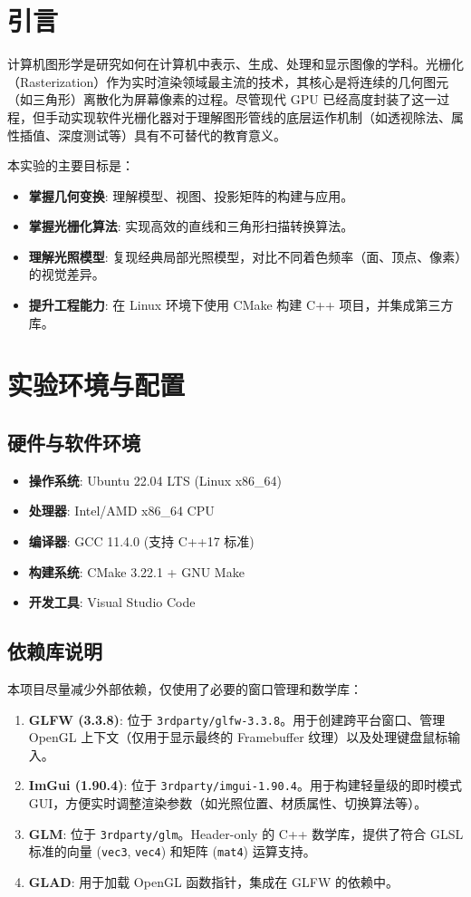 \documentclass[a4paper]{article}
\begin{document}
\section{引言}
计算机图形学是研究如何在计算机中表示、生成、处理和显示图像的学科。光栅化（Rasterization）作为实时渲染领域最主流的技术，其核心是将连续的几何图元（如三角形）离散化为屏幕像素的过程。尽管现代 GPU 已经高度封装了这一过程，但手动实现软件光栅化器对于理解图形管线的底层运作机制（如透视除法、属性插值、深度测试等）具有不可替代的教育意义。

本实验的主要目标是：
\begin{itemize}
    \item \textbf{掌握几何变换}: 理解模型、视图、投影矩阵的构建与应用。
    \item \textbf{掌握光栅化算法}: 实现高效的直线和三角形扫描转换算法。
    \item \textbf{理解光照模型}: 复现经典局部光照模型，对比不同着色频率（面、顶点、像素）的视觉差异。
    \item \textbf{提升工程能力}: 在 Linux 环境下使用 CMake 构建 C++ 项目，并集成第三方库。
\end{itemize}

\section{实验环境与配置}

\subsection{硬件与软件环境}
\begin{itemize}
    \item \textbf{操作系统}: Ubuntu 22.04 LTS (Linux x86\_64)
    \item \textbf{处理器}: Intel/AMD x86\_64 CPU
    \item \textbf{编译器}: GCC 11.4.0 (支持 C++17 标准)
    \item \textbf{构建系统}: CMake 3.22.1 + GNU Make
    \item \textbf{开发工具}: Visual Studio Code
\end{itemize}

\subsection{依赖库说明}
本项目尽量减少外部依赖，仅使用了必要的窗口管理和数学库：
\begin{enumerate}
    \item \textbf{GLFW (3.3.8)}: 位于 \texttt{3rdparty/glfw-3.3.8}。用于创建跨平台窗口、管理 OpenGL 上下文（仅用于显示最终的 Framebuffer 纹理）以及处理键盘鼠标输入。
    \item \textbf{ImGui (1.90.4)}: 位于 \texttt{3rdparty/imgui-1.90.4}。用于构建轻量级的即时模式 GUI，方便实时调整渲染参数（如光照位置、材质属性、切换算法等）。
    \item \textbf{GLM}: 位于 \texttt{3rdparty/glm}。Header-only 的 C++ 数学库，提供了符合 GLSL 标准的向量 (\texttt{vec3}, \texttt{vec4}) 和矩阵 (\texttt{mat4}) 运算支持。
    \item \textbf{GLAD}: 用于加载 OpenGL 函数指针，集成在 GLFW 的依赖中。
\end{enumerate}
\end{document}
